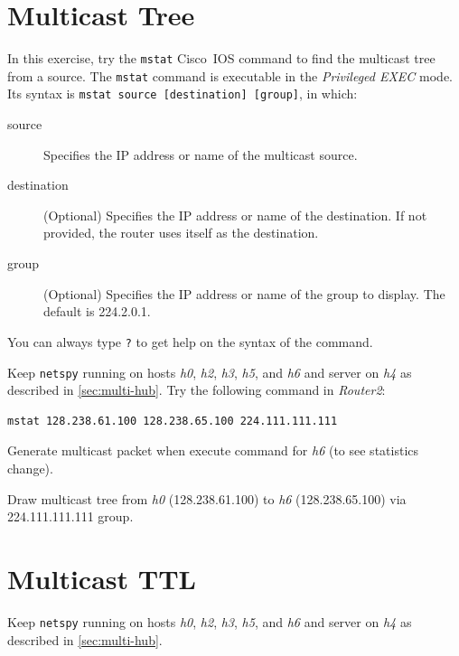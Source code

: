 \documentclass{../UTNetLab}
\begin{document}
\section{Multicast Tree}
    In this exercise, try the \lstinline[language={cisco}]{mstat} Cisco~IOS command to find the multicast tree from a source.
    The \lstinline[language={cisco}]{mstat} command is executable in the \textit{Privileged EXEC} mode.
    Its syntax is \lstinline[language={cisco}, emph={source, destination, group}]{mstat source [destination] [group]}, in which:
    \begin{description}
        \item[source] Specifies the IP address or name of the multicast source.
        \item[destination] (Optional) Specifies the IP address or name of the destination. If not provided, the router uses itself as the destination.
        \item[group] (Optional) Specifies the IP address or name of the group to display. The default is 224.2.0.1.
    \end{description}
    You can always type \lstinline[language={cisco}]{?} to get help on the syntax of the command.

    Keep \lstinline{netspy} running on hosts \textit{h0}, \textit{h2}, \textit{h3}, \textit{h5}, and \textit{h6} and server on \textit{h4} as described in \autoref{sec:multi-hub}.
    Try the following command in \textit{Router2}:

    \begin{lstlisting}[language={cisco}]
mstat 128.238.61.100 128.238.65.100 224.111.111.111
    \end{lstlisting}

    Generate multicast packet when execute command for \textit{h6} (to see statistics change).

    \begin{report}
    \item Draw multicast tree from \textit{h0} (128.238.61.100) to \textit{h6} (128.238.65.100) via 224.111.111.111 group.
    \end{report}

\section{Multicast TTL}
    Keep \lstinline{netspy} running on hosts \textit{h0}, \textit{h2}, \textit{h3}, \textit{h5}, and \textit{h6} and server on \textit{h4} as described in \autoref{sec:multi-hub}.
    
\end{document}
